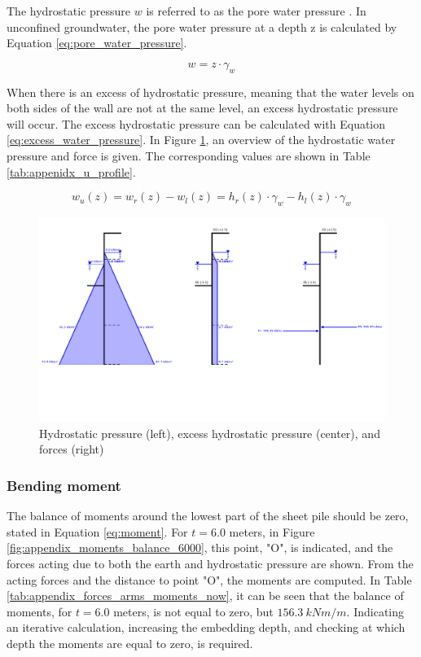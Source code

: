 The hydrostatic pressure $w$ is referred to as the pore water pressure \autocite{grabeSheetPilingHandbook2008}. In unconfined groundwater, the pore water pressure at a depth z is calculated by Equation \ref{eq:pore_water_pressure}.

\begin{equation}
    w = z \cdot \gamma_{w}
    \label{eq:pore_water_pressure}
\end{equation}

When there is an excess of hydrostatic pressure, meaning that the water levels on both sides of the wall are not at the same level, an excess hydrostatic pressure will occur. The excess hydrostatic pressure can be calculated with Equation \ref{eq:excess_water_pressure}. In Figure \ref{fig:hydrostatic_excess_pressure}, an overview of the hydrostatic water pressure and force is given. The corresponding values are shown in Table \ref{tab:appenidx_u_profile}. 

\begin{equation}
    w_{u}(z) = w_{r}(z) - w_{l}(z) = h_{r}(z) \cdot \gamma_{w} - h_{l}(z) \cdot \gamma_{w}
    \label{eq:excess_water_pressure}
\end{equation}

\begin{figure}[H]
    \centering
    \includegraphics[width=0.75\linewidth]{figures/ch8/water_overview.png}
    \caption{Hydrostatic pressure (left), excess hydrostatic pressure (center), and forces (right)}
    \label{fig:hydrostatic_excess_pressure}
\end{figure}

\subsubsection{Bending moment}

The balance of moments around the lowest part of the sheet pile should be zero,  stated in Equation \ref{eq:moment}. For $t = 6.0$ meters, in Figure \ref{fig:appendix_moments_balance_6000}, this point, "O", is indicated, and the forces acting due to both the earth and hydrostatic pressure are shown. From the acting forces and the distance to point "O", the moments are computed. In Table \ref{tab:appendix_forces_arms_moments_now}, it can be seen that the balance of moments, for $t = 6.0$ meters, is not equal to zero, but $156.3 \ kNm/m$. Indicating an iterative calculation, increasing the embedding depth, and checking at which depth the moments are equal to zero, is required.

